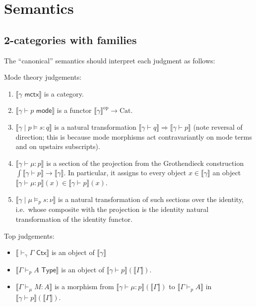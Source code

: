 \documentclass[10pt]{article}
\theoremstyle{definition}
\newcommand{\yields}{\vdash}
\newcommand{\CTX}{\,\,\mathsf{Ctx}}
\newcommand{\ctx}{\,\,\mathsf{mctx}}
\newcommand{\TYPE}{\,\,\mathsf{Type}}
\newcommand{\type}{\,\,\mathsf{mode}}
\newcommand\TypeTwo[4]{\ensuremath{#1 \mid #3 \vDash #2 : #4}}
\newcommand\TermTwoT[5]{\ensuremath{#1 \mid #3 \vDash_{#5} {#2} : #4}}
\newcommand\mm[1]{\llbracket #1 \rrbracket}
\newcommand\op{^{\mathrm{op}}}
\newcommand\Cat{\mathrm{Cat}}
\begin{document}
\section{Semantics}
\label{sec:semantics}

\subsection{2-categories with families}
\label{sec:2cwfs}

The ``canonical'' semantics should interpret each judgment as follows:

Mode theory judgements:
\begin{enumerate}
\item $\mm{\gamma \ctx}$ is a category.
\item $\mm{\gamma \yields p \type}$ is a functor $\mm{\gamma}\op \to \Cat$.
\item $\mm{\TypeTwo{\gamma}{s}{p}{q}}$ is a natural transformation $\mm{\gamma \yields q} \Rightarrow \mm{\gamma \yields p}$ (note reversal of direction; this is because mode morphisms act contravariantly on mode terms and on upstairs subscripts).
\item $\mm{\gamma \yields \mu : p}$ is a section of the projection from the Grothendieck construction $\int\mm{\gamma\yields p} \to \mm{\gamma}$.
  In particular, it assigns to every object $x\in \mm{\gamma}$ an object $\mm{\gamma \yields \mu : p}(x)\in \mm{\gamma\yields p}(x)$.
\item $\mm{\TermTwoT{\gamma}{s}{\mu}{\nu}{p}}$ is a natural transformation of such sections over the identity, i.e.\ whose composite with the projection is the identity natural transformation of the identity functor.
\end{enumerate}

Top judgements: 
\begin{itemize}
\item $\mm{\yields_\gamma \Gamma \CTX}$ is an object of $\mm{\gamma}$
\item $\mm{\Gamma \yields_p A \TYPE}$ is an object of $\mm{\gamma \yields p}(\mm{\Gamma})$.
\item $\mm{\Gamma \yields_\mu M : A}$ is a morphism from $\mm{\gamma \yields \mu : p}(\mm{\Gamma})$ to $\mm{\Gamma \yields_p A}$ in $\mm{\gamma \yields p}(\mm{\Gamma})$.
\end{itemize}
\end{document}
